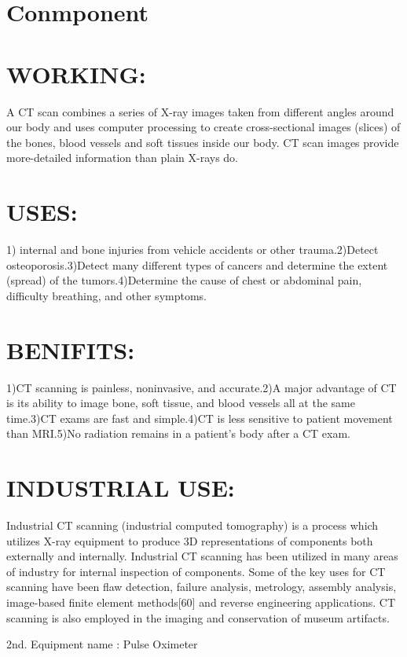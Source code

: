 \documentclass[12pt]{article}
\begin{document}
\section{Conmponent }     
            
\section{WORKING:}
   A CT scan combines a series of X-ray images taken from different angles around our body and uses computer processing to create cross-sectional images (slices) of the bones, blood vessels and soft tissues inside our body. CT scan images provide more-detailed information than plain X-rays do. 
   
\section{USES:}
1) internal and bone injuries from vehicle accidents or other trauma.2)Detect osteoporosis.3)Detect many different types of cancers and determine the extent (spread) of the tumors.4)Determine the cause of chest or abdominal pain, difficulty breathing, and other symptoms.

\section{BENIFITS:}
 1)CT scanning is painless, noninvasive, and accurate.2)A major advantage of CT is its ability to image bone, soft tissue, and blood vessels all at the same time.3)CT exams are fast and simple.4)CT is less sensitive to patient movement than MRI.5)No radiation remains in a patient's body after a CT exam.
 
\section{INDUSTRIAL USE:}
Industrial CT scanning (industrial computed tomography) is a process which utilizes X-ray equipment to produce 3D representations of components both externally and internally. Industrial CT scanning has been utilized in many areas of industry for internal inspection of components. Some of the key uses for CT scanning have been flaw detection, failure analysis, metrology, assembly analysis, image-based finite element methods[60] and reverse engineering applications. CT scanning is also employed in the imaging and conservation of museum artifacts.

\maketitle
\clearpage
2nd.  Equipment name : Pulse Oximeter
\end{document}
